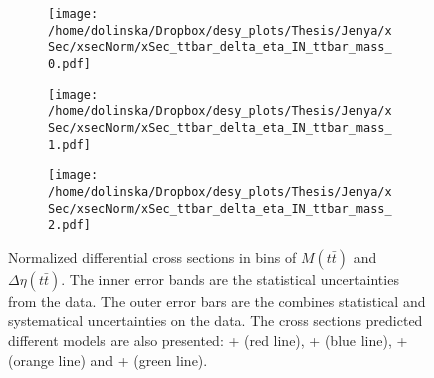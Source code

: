 
\begin{figure}[p]
\centering
\begin{subfigure}
  \centering
  \texttt{[image: /home/dolinska/Dropbox/desy\_plots/Thesis/Jenya/xSec/xsecNorm/xSec\_ttbar\_delta\_eta\_IN\_ttbar\_mass\_0.pdf]}
\end{subfigure}
\begin{subfigure}
  \centering
  \texttt{[image: /home/dolinska/Dropbox/desy\_plots/Thesis/Jenya/xSec/xsecNorm/xSec\_ttbar\_delta\_eta\_IN\_ttbar\_mass\_1.pdf]}
\end{subfigure}
\begin{subfigure}
  \centering
  \texttt{[image: /home/dolinska/Dropbox/desy\_plots/Thesis/Jenya/xSec/xsecNorm/xSec\_ttbar\_delta\_eta\_IN\_ttbar\_mass\_2.pdf]}
\end{subfigure}
\caption{Normalized differential cross sections in bins of $M(t\bar{t})$ and $\Delta\eta(t\bar{t})$. The inner error bands are the statistical uncertainties from the data.
         The outer error bars are the combines statistical and systematical uncertainties on the data. The cross sections predicted different models are also presented:
         \MG + \PYTHIA (red line), \Powheg + \PYTHIA (blue line), \Powheg + \HERWIG (orange line) and \MCNLO + \HERWIG (green line).}
\label{fig:XS_2D_eta_Mtt}
\end{figure}

